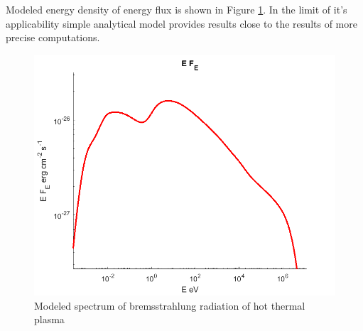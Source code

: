 Modeled energy density of energy flux is shown in Figure \ref{bremsstrahlungFigure}. In the limit of it's applicability simple analytical model provides results close to the results of more precise computations.

\begin{figure}
	\centering
	\includegraphics[width=12.5 cm]{./fig/compton.png} 
	\caption{Modeled spectrum of bremsstrahlung radiation of hot thermal plasma}
	\label{bremsstrahlungFigure}
\end{figure}
